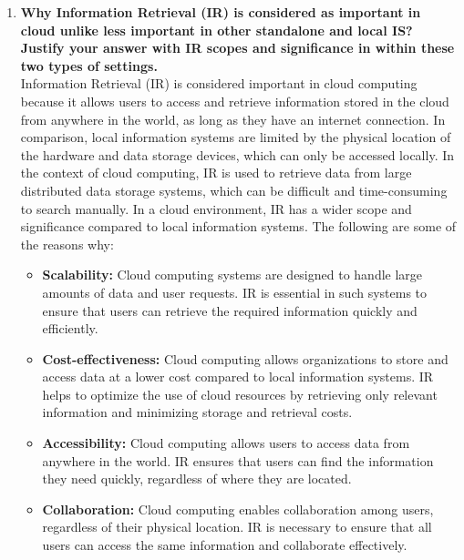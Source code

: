 \documentclass[12pt]{article}
\begin{document}
\begin{enumerate}
    \item{\bfseries Why Information Retrieval (IR) is considered as important in cloud unlike less important in other standalone and local IS? Justify your answer with IR scopes and significance in within these two types of settings.\\}
    Information Retrieval (IR) is considered important in cloud computing because it allows users to access and retrieve information stored in the cloud from anywhere in the world, as long as they have an internet connection. In comparison, local information systems are limited by the physical location of the hardware and data storage devices, which can only be accessed locally.
    In the context of cloud computing, IR is used to retrieve data from large distributed data storage systems, which can be difficult and time-consuming to search manually. In a cloud environment, IR has a wider scope and significance compared to local information systems. The following are some of the reasons why:
    \begin{itemize}
        \item {\bfseries Scalability:} Cloud computing systems are designed to handle large amounts of data and user requests. IR is essential in such systems to ensure that users can retrieve the required information quickly and efficiently.
        \item {\bfseries Cost-effectiveness:} Cloud computing allows organizations to store and access data at a lower cost compared to local information systems. IR helps to optimize the use of cloud resources by retrieving only relevant information and minimizing storage and retrieval costs.
        \item {\bfseries Accessibility:} Cloud computing allows users to access data from anywhere in the world. IR ensures that users can find the information they need quickly, regardless of where they are located.
        \item {\bfseries Collaboration:} Cloud computing enables collaboration among users, regardless of their physical location. IR is necessary to ensure that all users can access the same information and collaborate effectively.
    \end{itemize}


\end{enumerate}
\end{document}
